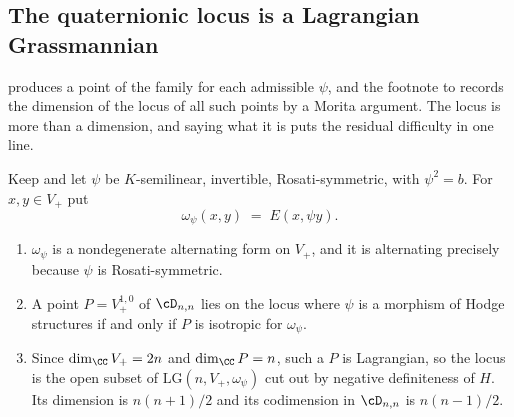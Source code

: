 \subsection{The quaternionic locus is a Lagrangian Grassmannian}
\label{ssec:lagrangian}

 produces a point of the family for each admissible
$\psi$, and the footnote to  records the dimension of the
locus of all such points by a Morita argument. The locus is more than a
dimension, and saying what it is puts the residual difficulty in one line.

\begin{proposition}\label{prop:lagrangian}
Keep  and let $\psi$ be $K$-semilinear, invertible,
Rosati-symmetric, with $\psi^{2}=b$. For $x,y\in V_{+}$ put
\[
  \omega_{\psi}(x,y)\;=\;E(x,\psi y).
\]
\begin{enumerate}[label=\textup{(\roman*)},nosep]
\item $\omega_{\psi}$ is a nondegenerate alternating form on $V_{+}$, and it
  is alternating precisely because $\psi$ is Rosati-symmetric.
\item A point $P=V_{+}^{1,0}$ of $\cD_{n,n}$ lies on the locus where $\psi$
  is a morphism of Hodge structures if and only if $P$ is isotropic for
  $\omega_{\psi}$.
\item Since $\dim_{\CC}V_{+}=2n$ and $\dim_{\CC}P=n$, such a $P$ is
  Lagrangian, so the locus is the open subset of
  $\mathrm{LG}(n,V_{+},\omega_{\psi})$ cut out by negative definiteness of
  $H$. Its dimension is $n(n+1)/2$ and its codimension in $\cD_{n,n}$ is
  $n(n-1)/2$.
\end{enumerate}
\end{proposition}

